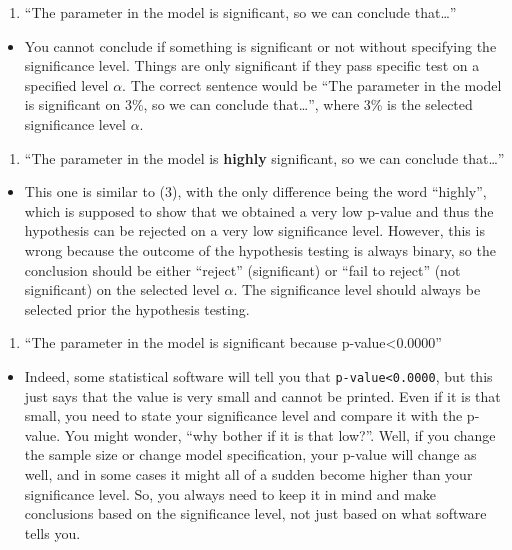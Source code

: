 \documentclass[
]{book}
\providecommand{\tightlist}{%
  \setlength{\itemsep}{0pt}\setlength{\parskip}{0pt}}
\theoremstyle{definition}
\theoremstyle{definition}
\theoremstyle{definition}
\theoremstyle{definition}
\theoremstyle{remark}
\begin{document}
\begin{enumerate}
\def\labelenumi{\arabic{enumi}.}
\setcounter{enumi}{2}
\tightlist
\item
  ``The parameter in the model is significant, so we can conclude that\ldots{}''
\end{enumerate}

\begin{itemize}
\tightlist
\item
  You cannot conclude if something is significant or not without specifying the significance level. Things are only significant if they pass specific test on a specified level \(\alpha\). The correct sentence would be ``The parameter in the model is significant on 3\%, so we can conclude that\ldots{}'', where 3\% is the selected significance level \(\alpha\).
\end{itemize}

\begin{enumerate}
\def\labelenumi{\arabic{enumi}.}
\setcounter{enumi}{3}
\tightlist
\item
  ``The parameter in the model is \textbf{highly} significant, so we can conclude that\ldots{}''
\end{enumerate}

\begin{itemize}
\tightlist
\item
  This one is similar to (3), with the only difference being the word ``highly'', which is supposed to show that we obtained a very low p-value and thus the hypothesis can be rejected on a very low significance level. However, this is wrong because the outcome of the hypothesis testing is always binary, so the conclusion should be either ``reject'' (significant) or ``fail to reject'' (not significant) on the selected level \(\alpha\). The significance level should always be selected prior the hypothesis testing.
\end{itemize}

\begin{enumerate}
\def\labelenumi{\arabic{enumi}.}
\setcounter{enumi}{4}
\tightlist
\item
  ``The parameter in the model is significant because p-value\textless0.0000''
\end{enumerate}

\begin{itemize}
\tightlist
\item
  Indeed, some statistical software will tell you that \texttt{p-value\textless{}0.0000}, but this just says that the value is very small and cannot be printed. Even if it is that small, you need to state your significance level and compare it with the p-value. You might wonder, ``why bother if it is that low?''. Well, if you change the sample size or change model specification, your p-value will change as well, and in some cases it might all of a sudden become higher than your significance level. So, you always need to keep it in mind and make conclusions based on the significance level, not just based on what software tells you.
\end{itemize}
\end{document}
